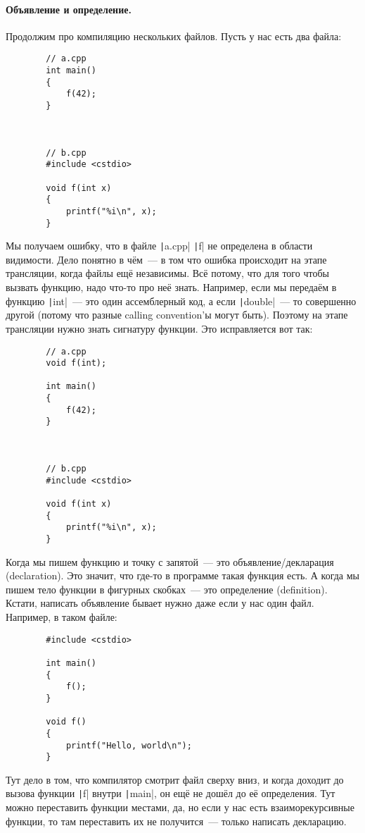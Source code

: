 \documentclass{article}
\begin{document}
    \paragraph{Объявление и определение.}
    Продолжим про компиляцию нескольких файлов. Пусть у нас есть два файла:
    \begin{verbatim}
        // a.cpp
        int main()
        {
            f(42);
        }



        // b.cpp
        #include <cstdio>
        
        void f(int x)
        {
            printf("%i\n", x);
        }
    \end{verbatim}
    Мы получаем ошибку, что в файле \texttt|a.cpp| \texttt|f| не определена в области видимости. Дело понятно в чём~--- в том что ошибка происходит на этапе трансляции, когда файлы ещё независимы. Всё потому, что для того чтобы вызвать функцию, надо что-то про неё знать. Например, если мы передаём в функцию \texttt|int|~--- это один ассемблерный код, а если \texttt|double|~--- то совершенно другой (потому что разные calling convention'ы могут быть). Поэтому на этапе трансляции нужно знать сигнатуру функции. Это исправляется вот так:
    \begin{verbatim}
        // a.cpp
        void f(int);

        int main()
        {
            f(42);
        }



        // b.cpp
        #include <cstdio>
    
        void f(int x)
        {
            printf("%i\n", x);
        }
    \end{verbatim}
    Когда мы пишем функцию и точку с запятой~--- это объявление/декларация (declaration). Это значит, что где-то в программе такая функция есть. А когда мы пишем тело функции в фигурных скобках~--- это определение (definition).\\
    Кстати, написать объявление бывает нужно даже если у нас один файл. Например, в таком файле:
    \begin{verbatim}
        #include <cstdio>

        int main()
        {
            f();
        }

        void f()
        {
            printf("Hello, world\n");
        }
    \end{verbatim}
    Тут дело в том, что компилятор смотрит файл сверху вниз, и когда доходит до вызова функции \texttt|f| внутри \texttt|main|, он ещё не дошёл до её определения. Тут можно переставить функции местами, да, но если у нас есть взаиморекурсивные функции, то там переставить их не получится~--- только написать декларацию.
\end{document}
